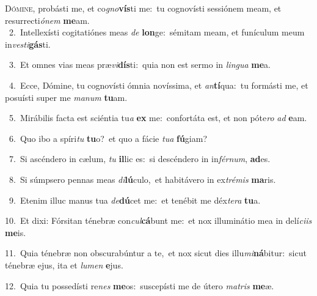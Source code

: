 \lettrine{\initial\textcolor{\initialcolor}{D}}{ómine,} probásti me, et co\-\textit{gno}\-\textbf{vís}ti me:~\star tu cognovísti sessiónem meam, et resurrecti\-\textit{ó}\-\textit{nem} \textbf{me}\-am.\\
{\numbfont\textcolor{\numbcolor}{~2.}}~Intellexísti cogitatiónes meas \textit{de} \textbf{lon}\-ge:~\star sémitam meam, et funículum meum in\-\textit{ves}\-\textit{ti}\textbf{gás}ti.\par
{\numbfont\textcolor{\numbcolor}{~3.}}~Et omnes vias meas præ\-\textit{vi}\-\textbf{dís}ti:~\star quia non est sermo in \textit{lin}\-\textit{gua} \textbf{me}\-a.\par
{\numbfont\textcolor{\numbcolor}{~4.}}~Ecce, Dómine, tu cognovísti ómnia novíssima, et \textit{an}\-\textbf{tí}qua:~\star tu formásti me, et posuísti super me \textit{ma}\-\textit{num} \textbf{tu}\-am.\par
{\numbfont\textcolor{\numbcolor}{~5.}}~Mirábilis facta est sciéntia tu\textit{a} \textbf{ex} me:~\star confortáta est, et non póte\textit{ro} \textit{ad} \textbf{e}\-am.\par
{\numbfont\textcolor{\numbcolor}{~6.}}~Quo ibo a spíri\textit{tu} \textbf{tu}\-o?~\star et quo a fácie \textit{tu}\-\textit{a} \textbf{fú}\-giam?\par
{\numbfont\textcolor{\numbcolor}{~7.}}~Si ascéndero in cælum, \textit{tu} \textbf{il}\-lic es:~\star si descéndero in in\-\textit{fér}\-\textit{num}, \textbf{ad}\-es.\par
{\numbfont\textcolor{\numbcolor}{~8.}}~Si súmpsero pennas meas \textit{di}\-\textbf{lú}culo,~\star et habitávero in ex\-\textit{tré}\-\textit{mis} \textbf{ma}\-ris.\par
{\numbfont\textcolor{\numbcolor}{~9.}}~Etenim illuc manus tua \textit{de}\-\textbf{dú}cet me:~\star et tenébit me déx\-\textit{te}\-\textit{ra} \textbf{tu}\-a.\par
{\numbfont\textcolor{\numbcolor}{10.}}~Et dixi: Fórsitan ténebræ con\-\textit{cul}\-\textbf{cá}bunt me:~\star et nox illuminátio mea in delí\-\textit{ci}\-\textit{is} \textbf{me}\-is.\par
{\numbfont\textcolor{\numbcolor}{11.}}~Quia ténebræ non obscurabúntur a te,~\dagger et nox sicut dies illu\-\textit{mi}\-\textbf{ná}bitur:~\star sicut ténebræ ejus, ita et \textit{lu}\-\textit{men} \textbf{e}\-jus.\par
{\numbfont\textcolor{\numbcolor}{12.}}~Quia tu possedísti re\textit{nes} \textbf{me}\-os:~\star suscepísti me de útero \textit{ma}\-\textit{tris} \textbf{me}\-æ.\par
